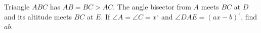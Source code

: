 Triangle $ABC$ has $AB=BC>AC$. The angle bisector from $A$ meets $BC$ at $D$ and its altitude meets $BC$ at $E$. If $\angle A=\angle C=x^\circ$ and $\angle DAE=(ax-b)^\circ$, find $ab$.
